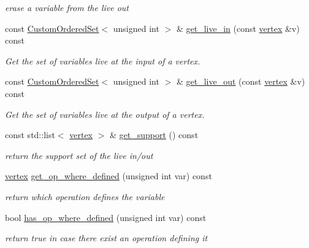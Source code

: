 \begin{DoxyCompactItemize}
\begin{DoxyCompactList}\small\item\em erase a variable from the live out \end{DoxyCompactList}\item 
const \hyperlink{classCustomOrderedSet}{Custom\+Ordered\+Set}$<$ unsigned int $>$ \& \hyperlink{classliveness_a13fa885bb8a47eccb3483da6333665fd}{get\+\_\+live\+\_\+in} (const \hyperlink{graph_8hpp_abefdcf0544e601805af44eca032cca14}{vertex} \&v) const
\begin{DoxyCompactList}\small\item\em Get the set of variables live at the input of a vertex. \end{DoxyCompactList}\item 
const \hyperlink{classCustomOrderedSet}{Custom\+Ordered\+Set}$<$ unsigned int $>$ \& \hyperlink{classliveness_a7d8d790a7cfe2d54832f8edcc3365407}{get\+\_\+live\+\_\+out} (const \hyperlink{graph_8hpp_abefdcf0544e601805af44eca032cca14}{vertex} \&v) const
\begin{DoxyCompactList}\small\item\em Get the set of variables live at the output of a vertex. \end{DoxyCompactList}\item 
const std\+::list$<$ \hyperlink{graph_8hpp_abefdcf0544e601805af44eca032cca14}{vertex} $>$ \& \hyperlink{classliveness_a6f96d3e472466ac40bf1ab8fdd59adc4}{get\+\_\+support} () const
\begin{DoxyCompactList}\small\item\em return the support set of the live in/out \end{DoxyCompactList}\item 
\hyperlink{graph_8hpp_abefdcf0544e601805af44eca032cca14}{vertex} \hyperlink{classliveness_a14a41c047ba1373429e2eb1197fe692a}{get\+\_\+op\+\_\+where\+\_\+defined} (unsigned int var) const
\begin{DoxyCompactList}\small\item\em return which operation defines the variable \end{DoxyCompactList}\item 
bool \hyperlink{classliveness_ad19baefb1c0ef1ca086dd9db88e572aa}{has\+\_\+op\+\_\+where\+\_\+defined} (unsigned int var) const
\begin{DoxyCompactList}\small\item\em return true in case there exist an operation defining it \end{DoxyCompactList}\item 

\end{DoxyCompactItemize}
